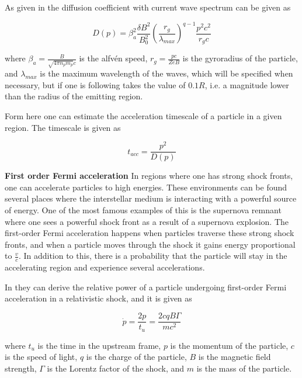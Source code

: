 As given in \cite{O_Sullivan_2009} the diffusion coefficient with current wave spectrum can be given as

\begin{equation}
    D(p) = \beta_a^2 \frac{\delta B^2}{B_0^2}\left(\frac{r_g}{\lambda_{max}}\right)^{q-1} \frac{p^2c^2}{r_g c}
\end{equation}

where $\beta_a = \frac{B}{\sqrt{4 \pi n_p m_p}c}$ is the alfvén speed, $r_g = \frac{pc}{ZeB}$ is the gyroradius of the particle, and $\lambda_{max}$ is the maximum wavelength of the waves, which will be specified when necessary, but if one is following \cite{O_Sullivan_2009} takes the value of $0.1 R$, i.e. a magnitude lower than the radius of the emitting region.

Form here one can estimate the acceleration timescale of a particle in a given region. The timescale is given as

\begin{equation}
    t_{acc} = \frac{p^2}{D(p)}
\end{equation}


\textbf{First order Fermi acceleration}
In regions where one has strong shock fronts, one can accelerate particles to high energies. These environments can be found several places where the interstellar medium is interacting with a powerful source of energy. One of the most famous examples of this is the supernova remnant where one sees a powerful shock front as a result of a supernova explosion.  
The first-order Fermi acceleration happens when particles traverse these strong shock fronts, and when a particle moves through the shock it gains energy proportional to $\frac{v}{c}$. In addition to this, there is a probability that the particle will stay in the accelerating region and 
experience several accelerations. 

In \cite{Dermer_2001} they can derive the relative power of a particle undergoing first-order Fermi acceleration in a relativistic shock, and it is given as 



\begin{equation}
    \dot p = \frac{2p}{t_u} = \frac{2cqB\Gamma}{mc^2 }
\end{equation}


where $t_u$ is the time in the upstream frame, $p$ is the momentum of the particle, $c$ is the speed of light, $q$ is the charge of the particle, $B$ is the magnetic field strength, $\Gamma$ is the Lorentz factor of the shock, and $m$ is the mass of the particle.

